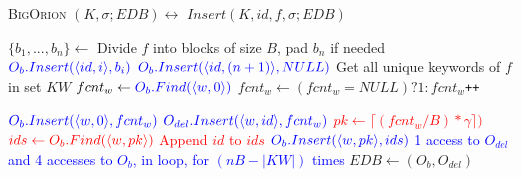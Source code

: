 \documentclass[sigconf]{acmart}
\newcommand{\pair}[2]{{\langle \ensuremath{#1, #2} \rangle}}
\newcommand{\vol}[1]{\lvert{#1}\rvert}
\newcommand{\ceil}[1]{\lceil #1 \rceil}
\newcommand{\BigOrion}{\textsc{BigOrion }}
\newcommand{\tblue}[1]{\textcolor{blue}{#1}}
\begin{document}
\begin{algorithm}
\caption{\BigOrion $(K,\sigma; EDB) \leftrightarrow$ $Insert(K, id, f, \sigma; EDB)$}\label{alg:boi}
\begin{algorithmic}[1]
\State$\{b_1,...,b_n\} \gets$ Divide $f$ into blocks of size $B$, pad $b_n$ if needed  \label{boinsalgo:blocks}
  \State $\tblue{O_{b}.Insert(\pair{id}{i},b_i)}$
 \EndFor \label{boinsalgo:insblocks}
  \State $\tblue{O_{b}.Insert(\pair{id}{(n+1)},NULL)}$ \label{boinsalgo:nullblock}
 \State Get all unique keywords of $f$ in set $KW$ 
  \label{boinsalgo:forloopstart}
    \State $fcnt_w \gets \tblue{O_{b}.Find(\pair{w}{0})}$ \label{boinsalgo:getfcnt}
    \State $fcnt_w \gets (fcnt_w=NULL)?1:fcnt_w$\texttt{++}\label{boinsalgo:fcntincr}
    
    \State $\tblue{O_{b}.Insert(\pair{w}{0},fcnt_w)}$\label{boinsalgo:setfcnt} \label{boinsalgo:fcntupdt}
    \State $\tblue{O_{del}.Insert(\pair{w}{id},fcnt_w)}$\label{boinsalgo:fcntidupdt}
   \State \textcolor{red}{$pk \gets \ceil{(fcnt_w/B)*\gamma})$}\label{boinsalgo:getpk} 
    \State $\textcolor{red}{ids \gets O_{b}.Find(\pair{w}{pk})}$ \label{boinsalgo:findidblock}
 \State \textcolor{red}{Append $id$ to $ids$ } \label{boinsalgo:appendid}
   \State $\tblue{O_{b}.Insert(\pair{w}{pk},ids)}$\label{boinsalgo:updtidblock}
\EndFor \label{boinsalgo:forloopend}
\State \tblue{1 access to $O_{del}$ and 4 accesses to $O_{b}$, in loop, for $(nB-\vol{KW})$ times} \label{boinsalgo:fake}
\State $EDB \gets (O_{b},O_{del})$ 
\end{algorithmic}
\label{Algo:BigorionInsert}
\end{algorithm}
\end{document}
